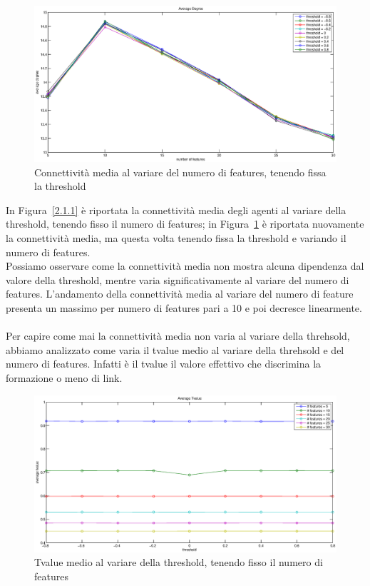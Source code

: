 \documentclass[a4paper,10pt]{article}
\begin{document}
\begin{figure}[!ht]
\begin{center}
\includegraphics[width=\textwidth]{AverageDegreeFeatures.eps}
\end{center}
\caption{Connettivit\`{a} media al variare del numero di features, tenendo fissa la threshold}
\label{2.1.2}
\end{figure}
In Figura~\ref{2.1.1} \`{e} riportata la connettivit\`{a} media degli agenti al variare della threshold, tenendo fisso il numero di features; in Figura~\ref{2.1.2} \`{e} riportata nuovamente la connettivit\`{a} media, ma questa volta tenendo fissa la threshold e variando il numero di features.
\\Possiamo osservare come la connettivit\`{a} media non mostra alcuna dipendenza dal valore della threshold, mentre varia significativamente al variare del numero di features. 
L'andamento della connettivit\`{a} media al variare del numero di feature presenta un massimo per numero di features pari a 10 e poi decresce linearmente.
\\\\Per capire come mai la connettivit\`{a} media non varia al variare della threhsold, abbiamo analizzato come varia il tvalue medio al variare della threhsold e del numero di features. Infatti \`{e} il tvalue il valore effettivo che discrimina la formazione o meno di link.

\begin{figure}[!ht]
\begin{center}
\includegraphics[width=\textwidth]{AverageTvalueThreshold.eps}
\end{center}
\caption{Tvalue medio al variare della threshold, tenendo fisso il numero di features}
\label{2.1.3}
\end{figure}
\end{document}
